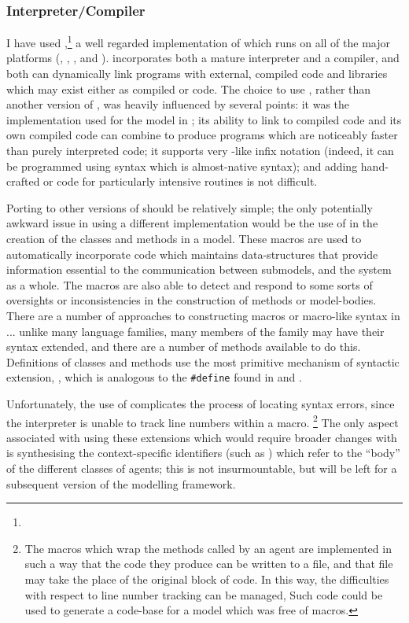 \subsubsection{Interpreter/Compiler}
I have used
\GambitC,\footnote{} a well
regarded implementation of \Scheme which runs on all of the major
platforms (\Linux, \Unix, \OSX, \Android and \Windows). \Gambit
incorporates both a mature \Scheme interpreter and a compiler, and
both can dynamically link programs with external, compiled code and
libraries which may exist either as compiled \CC or \Scheme code.  The
choice to use \Gambit, rather than another version of \Scheme, was
heavily influenced by several points: it was the implementation used
for the model in \Ctwo; its ability to link to compiled \CC code and
its own compiled code can combine to produce programs which are
noticeably faster than purely interpreted code; it supports
very \CC-like infix notation (indeed, it can be programmed using
syntax which is almost-native \CC syntax); and adding hand-crafted \CC
or \Cpp code for particularly intensive routines is not difficult.

Porting \ReModel to other versions of \Scheme should be relatively
simple; the only potentially awkward issue in using a
different \Scheme implementation would be the use of \sdefmac in the
creation of the classes and methods in a model.  These macros are used
to automatically incorporate code which maintains data-structures that
provide information essential to the communication between submodels,
and the system as a whole. The macros are also able to detect and
respond to some sorts of oversights or inconsistencies in the
construction of methods or model-bodies.  There are a number of
approaches to constructing macros or macro-like syntax in \Scheme
... unlike many language families, many members of the \Lisp family
may have their syntax extended, and there are a number of methods
available to do this.  Definitions of classes and methods use the most
primitive mechanism of syntactic extension, \sdefmac, which is
analogous to the \texttt{\#define} found in \CC and \Cpp.

Unfortunately, the use of \sdefmac complicates the process of locating
syntax errors, since the interpreter is unable to track line numbers
within a macro. \footnote{The macros which wrap the methods called by
an agent are implemented in such a way that the code they produce can
be written to a file, and that file may take the place of the original
block of code.  In this way, the difficulties with respect to line
number tracking can be managed, Such code could be used to generate a
code-base for a model which was free of macros.}  The only aspect
associated with using these extensions which would require broader
changes with \sdefsyntax is synthesising the context-specific
identifiers (such as ) which refer to the
``body'' of the different classes of agents; this is not
insurmountable, but will be left for a subsequent version of the
modelling framework.

